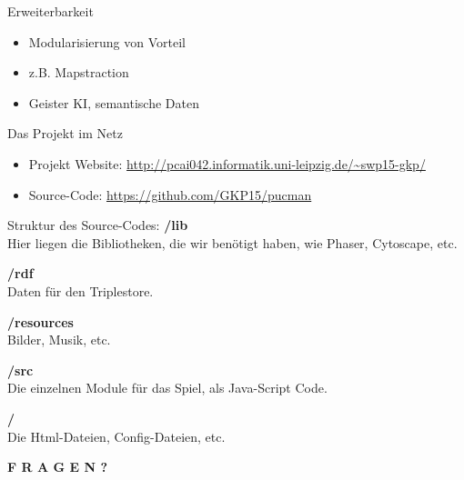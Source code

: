 \documentclass{beamer}
\begin{document}
\begin{frame}{Erweiterbarkeit}
\normalsize
\begin{itemize}
\item Modularisierung von Vorteil
\item z.B. Mapstraction
\item Geister KI, semantische Daten
\end{itemize}
\end{frame}
\begin{frame}{Das Projekt im Netz}
\begin{itemize}
\item Projekt Website: \url{http://pcai042.informatik.uni-leipzig.de/~swp15-gkp/} 
\item Source-Code: \url{https://github.com/GKP15/pucman}
\end{itemize}

\end{frame}
\begin{frame}{Struktur des Source-Codes:}
\textbf{/lib} \\
Hier liegen die Bibliotheken, die wir benötigt haben, wie Phaser, Cytoscape, etc. \par\bigskip
{\flushleft \textbf{/rdf}} \\
Daten für den Triplestore. \par\bigskip
{\flushleft \textbf{/resources}} \\
Bilder, Musik, etc. \par\bigskip
{\flushleft \textbf{/src}} \\
Die einzelnen Module für das Spiel, als Java-Script Code. \par\bigskip
{\flushleft \textbf{/}} \\
Die Html-Dateien, Config-Dateien, etc.  

\end{frame}






\begin{frame}
\Huge \center \textbf{F R A G E N ?}
\end{frame}
\end{document}
